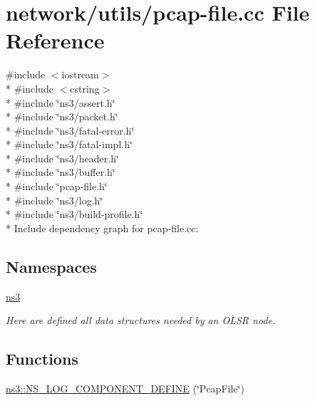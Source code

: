 \hypertarget{pcap-file_8cc}{}\section{network/utils/pcap-\/file.cc File Reference}
\label{pcap-file_8cc}
{\ttfamily \#include $<$iostream$>$}\\*
{\ttfamily \#include $<$cstring$>$}\\*
{\ttfamily \#include \char`\"{}ns3/assert.\+h\char`\"{}}\\*
{\ttfamily \#include \char`\"{}ns3/packet.\+h\char`\"{}}\\*
{\ttfamily \#include \char`\"{}ns3/fatal-\/error.\+h\char`\"{}}\\*
{\ttfamily \#include \char`\"{}ns3/fatal-\/impl.\+h\char`\"{}}\\*
{\ttfamily \#include \char`\"{}ns3/header.\+h\char`\"{}}\\*
{\ttfamily \#include \char`\"{}ns3/buffer.\+h\char`\"{}}\\*
{\ttfamily \#include \char`\"{}pcap-\/file.\+h\char`\"{}}\\*
{\ttfamily \#include \char`\"{}ns3/log.\+h\char`\"{}}\\*
{\ttfamily \#include \char`\"{}ns3/build-\/profile.\+h\char`\"{}}\\*
Include dependency graph for pcap-\/file.cc\+:
\subsection*{Namespaces}
\begin{DoxyCompactItemize}
\item 
 \hyperlink{namespacens3}{ns3}
\begin{DoxyCompactList}\small\item\em Here are defined all data structures needed by an O\+L\+SR node. \end{DoxyCompactList}\end{DoxyCompactItemize}
\subsection*{Functions}
\begin{DoxyCompactItemize}
\item 
\hyperlink{namespacens3_a7f9795ddbcd846937e43125ac253974c}{ns3\+::\+N\+S\+\_\+\+L\+O\+G\+\_\+\+C\+O\+M\+P\+O\+N\+E\+N\+T\+\_\+\+D\+E\+F\+I\+NE} (\char`\"{}Pcap\+File\char`\"{})
\end{DoxyCompactItemize}
